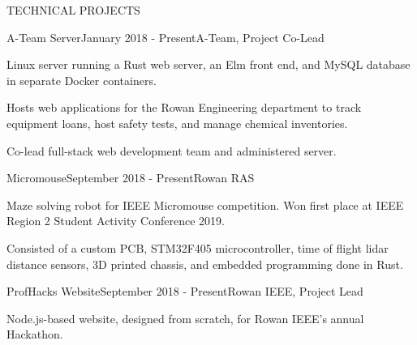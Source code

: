 \documentclass{resume} %
\begin{document}
\begin{rSection}{TECHNICAL PROJECTS}


  \begin{rSubsection}{A-Team Server}{January 2018 - Present}{A-Team, Project Co-Lead}{}
  \item Linux server running a Rust web server, an
    Elm front end, and MySQL database in separate Docker containers.
  \item Hosts web applications for the Rowan Engineering department to track equipment
    loans, host safety tests, and manage chemical inventories.
  \item Co-lead full-stack web development team and administered server.
  \end{rSubsection}




  \begin{rSubsection}{Micromouse}{September 2018 - Present}{Rowan RAS}{}
  \item Maze solving robot for IEEE Micromouse competition. Won first place at
    IEEE Region 2 Student Activity Conference 2019.
  \item Consisted of a custom PCB, STM32F405 microcontroller, time of flight lidar
    distance sensors, 3D printed chassis, and embedded programming done in Rust.
  \end{rSubsection}


  \begin{rSubsection}{ProfHacks Website}{September 2018 - Present}{Rowan IEEE, Project Lead}{}
  \item Node.js-based website, designed from scratch, for Rowan IEEE's annual Hackathon.
  \end{rSubsection}


\end{rSection}
\end{document}
